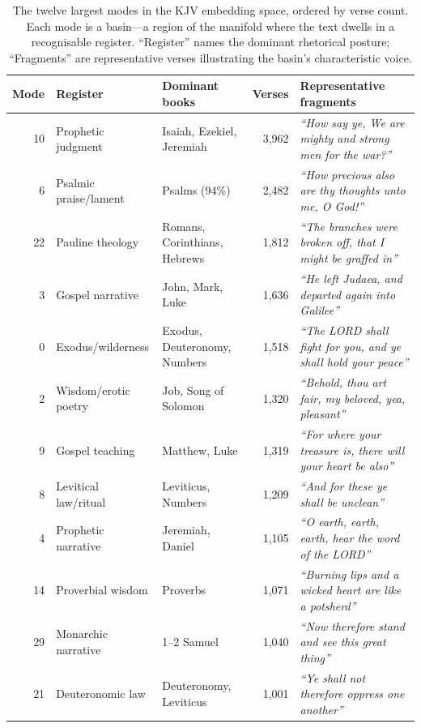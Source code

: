 \begin{landscape}
\begin{table}[p]
\centering
\begin{tabular}{@{}rl p{3.8cm} r p{6.5cm}@{}}
\toprule
\textbf{Mode} & \textbf{Register} & \textbf{Dominant books} & \textbf{Verses} & \textbf{Representative fragments} \\
\midrule
10 & Prophetic judgment & Isaiah, Ezekiel, Jeremiah & 3{,}962 &
  \emph{``How say ye, We are mighty and strong men for the war?''} \\[4pt]
6 & Psalmic praise/lament & Psalms (94\%) & 2{,}482 &
  \emph{``How precious also are thy thoughts unto me, O God!''} \\[4pt]
22 & Pauline theology & Romans, Corinthians, Hebrews & 1{,}812 &
  \emph{``The branches were broken off, that I might be graffed in''} \\[4pt]
3 & Gospel narrative & John, Mark, Luke & 1{,}636 &
  \emph{``He left Judaea, and departed again into Galilee''} \\[4pt]
0 & Exodus/wilderness & Exodus, Deuteronomy, Numbers & 1{,}518 &
  \emph{``The LORD shall fight for you, and ye shall hold your peace''} \\[4pt]
2 & Wisdom/erotic poetry & Job, Song of Solomon & 1{,}320 &
  \emph{``Behold, thou art fair, my beloved, yea, pleasant''} \\[4pt]
9 & Gospel teaching & Matthew, Luke & 1{,}319 &
  \emph{``For where your treasure is, there will your heart be also''} \\[4pt]
8 & Levitical law/ritual & Leviticus, Numbers & 1{,}209 &
  \emph{``And for these ye shall be unclean''} \\[4pt]
4 & Prophetic narrative & Jeremiah, Daniel & 1{,}105 &
  \emph{``O earth, earth, earth, hear the word of the LORD''} \\[4pt]
14 & Proverbial wisdom & Proverbs & 1{,}071 &
  \emph{``Burning lips and a wicked heart are like a potsherd''} \\[4pt]
29 & Monarchic narrative & 1--2 Samuel & 1{,}040 &
  \emph{``Now therefore stand and see this great thing''} \\[4pt]
21 & Deuteronomic law & Deuteronomy, Leviticus & 1{,}001 &
  \emph{``Ye shall not therefore oppress one another''} \\
\bottomrule
\end{tabular}
\caption{The twelve largest modes in the KJV embedding space, ordered by verse count. Each mode is a basin---a region of the manifold where the text dwells in a recognisable register. ``Register'' names the dominant rhetorical posture; ``Fragments'' are representative verses illustrating the basin's characteristic voice.}
\label{tab:kjv-basins}
\end{table}
\end{landscape}

